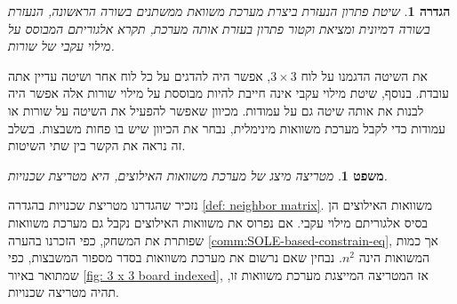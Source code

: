 \documentclass[12pt,leqno]{article}
\theoremstyle{theoremdd}
\newtheorem{definition}{הגדרה}[section]
\newtheorem{theorem}{משפט}[section]
\begin{document}
\begin{definition}
    \label{def: spanish way}
    שיטת פתרון הנעזרת ביצרת מערכת משוואת ממשתנים בשורה הראשונה,
    הנעזרת בשורה דמיונית
    ומציאת וקטור פתרון
    בעזרת אותה מערכת,
    תקרא 
    אלגוריתם המבוסס על מילוי עקבי של שורות.
\end{definition}
את השיטה הדגמנו על לוח 
$3 \times 3$,
אפשר היה להדגים על כל לוח אחר ושיטה עדיין אתה עובדת.
בנוסף, שיטת
מילוי עקבי אינה חייבת להיות מבוססת על מילוי שורות אלה 
אפשר היה לבנות את אותה שיטה גם על עמודות.
מכיוון שאפשר להפעיל את השיטה על שורות או עמודות 
כדי לקבל מערכת משוואות מינימלית, נבחר 
את הכיוון שיש בו פחות משבצות. 
בשלב זה נראה את הקשר בין שתי השיטות.
\begin{theorem}
    מטריצה מיצג של מערכת משוואות האילוצים, היא מטריצת שכנויות.
\end{theorem}
נזכיר שהגדרנו מטריצת שכנויות בהגדרה
\ref{def: neighbor matrix}.
משוואות האילוצים הן בסיס אלגוריתם מילוי עקבי.
אם נפרוס את משוואות האילוצים נקבל גם מערכת משוואות שפותרת את המשחק,
כפי הזכרנו בהערה 
\ref{comm:SOLE-based-constrain-eq},
אך כמות המשואות הינה 
$n^2$.
נבחין שאם נרשום את 
מערכת 
משוואות בסדר 
מספור המשבצות,
כפי שמתואר באיור 
\ref{fig: 3 x 3 board indexed},
אז
המטריצה המייצגת מערכת משוואות זו, תהיה 
מטריצה שכנויות.
\end{document}
